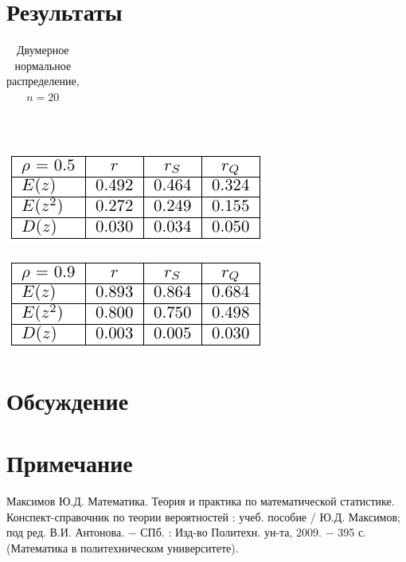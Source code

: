 \documentclass[a4paper]{article}
\begin{document}
\section{Результаты}
\begin{table}[H]
    \centering
    \begin{tabular}{|l|c|c|c|}
    \hline 
    
    \end{tabular}\\
    \begin{center}
        \includegraphics[]{LabSrcs/resources/20rho0.5.pdf}
    \end{center}
    \begin{center}
        \includegraphics[]{LabSrcs/resources/20rho0.9.pdf}
    \end{center}
    \caption{Двумерное нормальное распределение, $n=20$}
    \label{tab:my_label}
\end{table}
\section{Обсуждение}
\section*{Примечание}
\begin{thebibliography}{9}
 Максимов Ю.Д. Математика. Теория и практика по математической статистике. Конспект-справочник по теории вероятностей : учеб. пособие /
Ю.Д. Максимов; под ред. В.И. Антонова. $-$ СПб. : Изд-во Политехн.
ун-та, 2009. $-$ 395 с. (Математика в политехническом университете).
\end{thebibliography}
\end{document}

